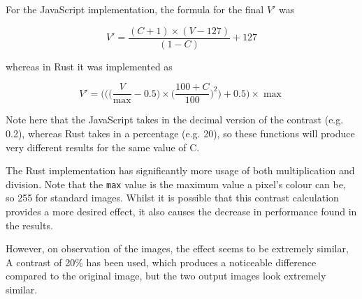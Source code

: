 \documentclass[12pt,a4paper]{article}
\begin{document}
For the JavaScript implementation, the formula for the final $V'$ was

$$
    V'=\frac{(C+1)\times (V-127)}{(1-C)}+127
$$

whereas in Rust it was implemented as

$$
    V'=\bigg(\bigg(\bigg(\frac{V}{\max}-0.5)\times\bigg(\frac{100+C}{100}\bigg)^2\bigg)+0.5\bigg)\times \max
$$

Note here that the JavaScript takes in the decimal version of the contrast (e.g. 0.2), whereas Rust takes in a percentage (e.g. 20), so these functions will produce very different results for the same value of C.

The Rust implementation has significantly more usage of both multiplication and division. Note that the \texttt{max} value is the maximum value a pixel's colour can be, so 255 for standard images. Whilst it is possible that this contrast calculation provides a more desired effect, it also causes the decrease in performance found in the results.

However, on observation of the images, the effect seems to be extremely similar, A contrast of 20\% has been used, which produces a noticeable difference compared to the original image, but the two output images look extremely similar.
\end{document}
